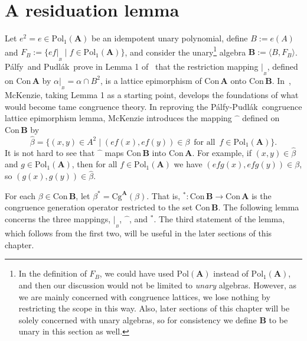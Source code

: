 \documentclass[cm,dissertation]{uhthesis}
\theoremstyle{plain}
\theoremstyle{definition}
\theoremstyle{remark}
\numberwithin{theorem}{section}
\numberwithin{claim}{chapter}
\numberwithin{equation}{section}
\numberwithin{conjecture}{chapter}
\newcommand{\PP}{P\'alfy-Pudl\'ak}
\newcommand{\PAP}{P\'alfy\ and Pudl\'ak}
\newcommand{\<}{\ensuremath{\langle}}
\renewcommand{\>}{\ensuremath{\rangle}}
\newcommand{\Cg}{\ensuremath{\mathrm{Cg}}}
\newcommand{\Con}{\ensuremath{\mathrm{Con\,}}}
\newcommand{\Pol}{\ensuremath{\mathrm{Pol}}}
\newcommand{\0}{\ensuremath{\mathbf{0}}}
\newcommand{\1}{\ensuremath{\mathbf{1}}}
\newcommand{\2}{\ensuremath{\mathbf{2}}}
\newcommand{\3}{\ensuremath{\mathbf{3}}}
\newcommand{\4}{\ensuremath{\mathbf{4}}}
\newcommand{\5}{\ensuremath{\mathbf{5}}}
\newcommand{\bA}{\ensuremath{\mathbf{A}}}
\newcommand{\bB}{\ensuremath{\mathbf{B}}}
\newcommand{\resB}{\ensuremath{|_{_B}}}
\newcommand{\hatmap}{\ensuremath{\widehat{\phantom{x}}}}
\begin{document}
\section{A residuation lemma}
\label{sec:residuation-lemma}

Let $e^2 = e \in \Pol_1(\bA)$ be an idempotent unary polynomial, define
$B:=e(A)$ and
$F_B := \{ef\resB \mid f\in \Pol_1(\bA)\}$, and consider the 
unary\footnote{In the definition of  $F_B$, we could have used 
  $\Pol(\bA)$ instead of $\Pol_1(\bA)$, and then our discussion would not be
  limited to \emph{unary} algebras.  However, as we are mainly concerned with
  congruence lattices, we lose nothing by restricting the scope in this way.  Also, 
  later sections of this chapter will be solely concerned with unary algebras, so
  for consistency we define $\bB$ to be unary in this section as well.} 
algebra $\bB:= \<B, F_B\>$.  \PAP\
prove in Lemma 1 of~\cite{Palfy:1980} that
the restriction mapping $\resB$, defined on $\Con\bA$ by 
$\alpha\resB = \alpha \cap B^2$, is a lattice epimorphism of $\Con\bA$ onto $\Con\bB$.
In~\cite{McKenzie:1983}, McKenzie, taking Lemma 1 as a starting point,
develops the foundations of what would become tame congruence theory.  
In reproving the \PP\ congruence lattice epimorphism lemma,
%
McKenzie introduces the mapping $\hatmap$ defined on $\Con\bB$ by 
\[
\widehat{\beta} = \{(x,y) \in A^2 \mid (ef(x), ef(y))\in \beta\, \text{ for all }\, f\in \Pol_1(\bA) \}.
\]
It is not hard to see that $\hatmap$ maps $\Con\bB$ into $\Con\bA$.  For
example, if $(x,y) \in \widehat{\beta}$ and $g\in \Pol_1(\bA)$, then for all $f\in \Pol_1(\bA)$ we
have $(efg(x),efg(y)) \in \beta$, so $(g(x),g(y))\in \widehat{\beta}$.

For each $\beta \in \Con\bB$, let $\beta^* = \Cg^\bA(\beta)$.  That is,
$^*: \Con\bB \rightarrow \Con\bA$ is
the congruence generation operator restricted to the set $\Con\bB$.
The following lemma concerns the three mappings, $\resB$, $\hatmap$, and $^*$.
The third statement of the lemma, which follows from the first two, 
will be useful in the later sections of this chapter.
\end{document}
